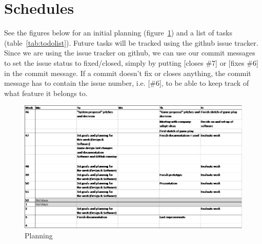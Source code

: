 \documentclass[a4paper,11pt,notitlepage]{report}
\begin{document}
\section{Schedules}
See the figures below for an initial planning (figure~\ref{fig:planning}) and a list of tasks (table~\ref{tab:todolist}).
Future tasks will be tracked using the github issue tracker.
Since we are using the issue tracker on github, we can use our commit messages to set the issue status to fixed/closed, simply by putting [closes \#7] or [fixes \#6] in the commit message. If a commit doesn't fix or closes anything, the commit message has to contain the issue number, i.e. [\#6], to be able to keep track of what feature it belongs to.

\begin{figure}[H]
	\centering
		\includegraphics[width=\textwidth]{Images/PlanningSmall.png}
	\caption{Planning}
	\label{fig:planning}
\end{figure}
\end{document}
